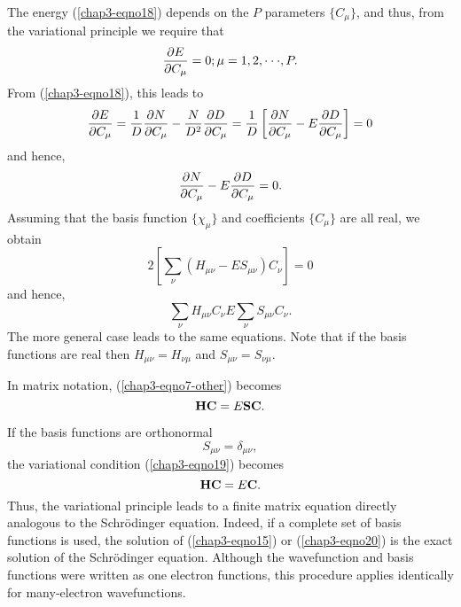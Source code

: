 The energy (\ref{chap3-eqno18}) depends on the $P$ parameters $\{
C_{\mu} \}$, and thus, from the variational principle we require that
\begin{equation}
{\partial E \over \partial C_{\mu}} = 0 ; \mu = 1 , 2 , \cdot \cdot 
\cdot , P.
\end{equation}
From (\ref{chap3-eqno18}), this leads to
\begin{equation}
{\partial E \over \partial C_{\mu}} = {1 \over D} {\partial N \over 
\partial C_{\mu}} - {N \over D^2} {\partial D \over \partial 
C_{\mu}} = {1 \over D} \left[ {\partial N \over \partial C_{\mu}} - 
E {\partial D \over \partial C_{\mu}} \right] = 0
\end{equation}
and hence,
\begin{equation}
{\partial N \over \partial C_{\mu}} - E {\partial D \over \partial 
C_{\mu}} = 0 .
\end{equation}
Assuming that the basis function $\{ \chi_{\mu} \}$ and coefficients 
$\{ C_{\mu} \}$ are all real, we obtain
\begin{equation}
2 \left[ \sum_{\nu} \left( H_{\mu \nu} - ES_{\mu \nu} \right) C_{\nu} 
\right] = 0
\end{equation}
and hence,
\begin{equation}
\sum_{\nu} H_{\mu \nu} C_{\nu}  E \sum_{\nu} S_{\mu \nu} C_{\nu} .
\label{chap3-eqno7-other}
\end{equation}
The more general case leads to the same equations.  Note that if the basis 
functions are real then $H_{\mu \nu} = H_{\nu \mu}$ and $S_{\mu \nu} = 
S_{\nu \mu}$.

In matrix notation, (\ref{chap3-eqno7-other}) becomes
\begin{equation}
{\bf H} {\bf C}  = E {\bf S} {\bf C}.
\label{chap3-eqno19}
\end{equation}

If the basis functions are orthonormal
\begin{equation}
S_{\mu \nu} = \delta_{\mu \nu} ,
\end{equation}
the variational condition (\ref{chap3-eqno19}) becomes
\begin{equation}
{\bf H} {\bf C} = E {\bf C}.
\label{chap3-eqno20}
\end{equation}
Thus, the variational principle leads to a finite matrix equation
directly analogous to the Schr\"odinger equation.  Indeed, if a
complete set of basis functions is used, the solution of
(\ref{chap3-eqno15}) or (\ref{chap3-eqno20}) is the exact solution of the
Schr\"odinger equation.  Although the wavefunction and basis functions
were written as one electron functions, this procedure applies
identically for many-electron wavefunctions.

